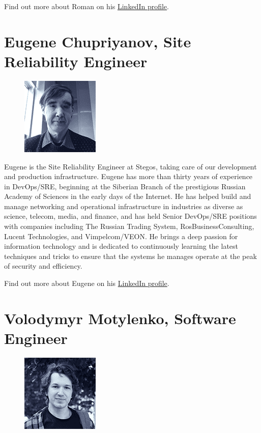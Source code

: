 \documentclass[8pt,fleqn,openany]{book}
\begin{document}
{{Find out more about Roman on his \href{https://linkedin.com/in/roman.tsisyk}{LinkedIn profile}.
}

\section{Eugene Chupriyanov, Site Reliability Engineer}

{
\setlength\intextsep{0pt}
\begin{figure}
	\includegraphics{images/team/team-5.png}
\end{figure}

Eugene is the Site Reliability Engineer at Stegos, taking care of our development and production infrastructure. Eugene has more than thirty years of experience in DevOps/SRE, beginning at the Siberian Branch of the prestigious Russian Academy of Sciences in the early days of the Internet. He has helped build and manage networking and operational infrastructure in industries as diverse as science, telecom, media, and finance, and has held Senior DevOps/SRE positions with companies including The Russian Trading System, RosBusinessConsulting, Lucent Technologies, and Vimpelcom/VEON. He brings a deep passion for information technology and is dedicated to continuously learning the latest techniques and tricks to ensure that the systems he manages operate at the peak of security and efficiency. 

Find out more about Eugene on his \href{https://www.linkedin.com/in/eugenechupriyanov/}{LinkedIn profile}.
}

\section{Volodymyr Motylenko, Software Engineer}

{
\setlength\intextsep{0pt}
\begin{figure}
	\includegraphics{images/team/team-6.png}
\end{figure}

}}
\end{document}
